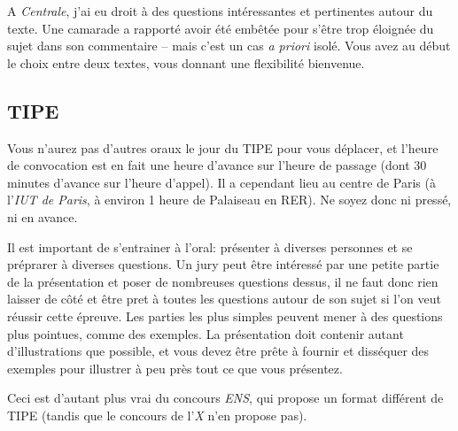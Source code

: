 \documentclass{article}
\begin{document}
A \textit{Centrale}, j'ai eu droit à des questions intéressantes et pertinentes autour du texte.
Une camarade a rapporté avoir été embêtée pour s'être trop éloignée du sujet dans son commentaire -- mais c'est un cas \textit{a priori} isolé.
Vous avez au début le choix entre deux textes, vous donnant une flexibilité bienvenue.

\subsection{TIPE}
Vous n'aurez pas d'autres oraux le jour du TIPE pour vous déplacer, et l'heure de convocation est en fait une heure d'avance sur l'heure de passage (dont 30 minutes d'avance sur l'heure d'appel).
Il a cependant lieu au centre de Paris (à l'\textit{IUT de Paris}, à environ 1 heure de Palaiseau en RER).
Ne soyez donc ni pressé, ni en avance.

Il est important de s'entrainer à l'oral: présenter à diverses personnes et se préprarer à diverses questions.
Un jury peut être intéressé par une petite partie de la présentation et poser de nombreuses questions dessus, il ne faut donc rien laisser de côté et être pret à toutes les questions autour de son sujet si l'on veut réussir cette épreuve.
Les parties les plus simples peuvent mener à des questions plus pointues, comme des exemples.
La présentation doit contenir autant d'illustrations que possible, et vous devez être prêt\textperiodcentered e à fournir et disséquer des exemples pour illustrer à peu près tout ce que vous présentez.

Ceci est d'autant plus vrai du concours \textit{ENS}, qui propose un format différent de TIPE (tandis que le concours de l'\textit{X} n'en propose pas).
\end{document}
